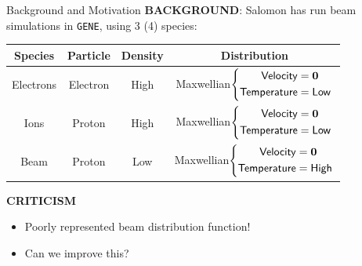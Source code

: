     \begin{frame}{Background and Motivation}
        \vspace{0.5mm}
        {\bf BACKGROUND}: Salomon has run beam simulations in {\tt GENE}, using 3 (4) species:
        \vspace{0.5mm}
        {\footnotesize \begin{center}\begin{tabular}{ c || c | c | c }
            Species  &  Particle  &  Density  &  Distribution  \\
            \hline\hline
            Electrons  &  Electron  &  High  &  Maxwellian$\left\{\begin{aligned}  {\sf Velocity}  &=  \mathbf{0} 
    \\  {\sf Temperature}  &=  {\sf Low}  \end{aligned}\right.$  \\
            \hline
            Ions  &  Proton  &  High  &  Maxwellian$\left\{\begin{aligned}  {\sf Velocity}  &=  \mathbf{0} 
    \\  {\sf Temperature}  &=  {\sf Low}  \end{aligned}\right.$  \\
            \hline
            Beam  &  Proton  &  Low  &  {\color{red!90} Maxwellian$\left\{\begin{aligned}  {\sf Velocity}  &=  \mathbf{0}
    \\  {\sf Temperature}  &=  {\sf High}  \end{aligned}\right.$}
        \end{tabular}\end{center}}
        
        \begin{alertblock}{\bf CRITICISM}
            \begin{itemize}
                \item  Poorly represented beam distribution function!

                \item  Can we improve this?
            \end{itemize}
        \end{alertblock}
    \end{frame}
    
